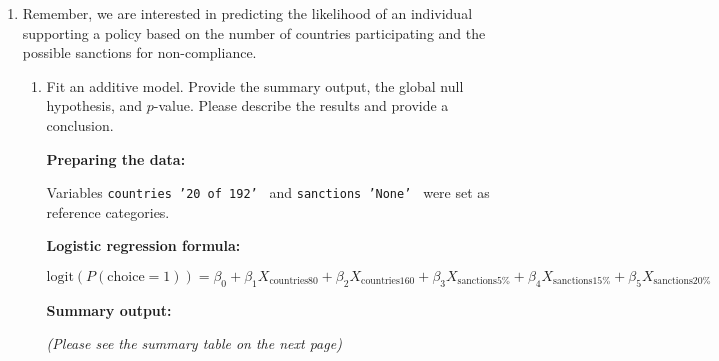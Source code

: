 \documentclass[12pt,letterpaper]{article}
\begin{document}
\begin{enumerate}
	\item
	Remember, we are interested in predicting the likelihood of an individual supporting a policy based on the number of countries participating and the possible sanctions for non-compliance.
	\begin{enumerate}
		\item [] Fit an additive model. Provide the summary output, the global null hypothesis, and $p$-value. Please describe the results and provide a conclusion.

\vspace{.25cm}
\textbf{Preparing the data:}
	 
	
Variables \texttt{countries '20 of 192' } and \texttt{sanctions 'None' } were set as reference categories.
	
\textbf{Logistic regression formula:}

\begin{center}
	$\text{logit}(P(\text{choice}=1)) = \beta_0 + \beta_1 X_{\text{countries80}} + \beta_2 X_{\text{countries160}} + \beta_3 X_{\text{sanctions}5\%} + \beta_4 X_{\text{sanctions}15\%} + \beta_5 X_{\text{sanctions}20\%}$
\end{center}


\textbf{Summary output:}

	 
	
\textit{	(Please see the summary table on the next page)}


\end{enumerate}
\end{enumerate}
\end{document}
